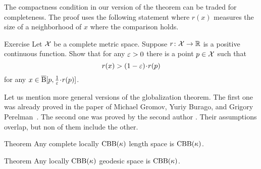 The compactness condition in our version of the theorem can be traded for completeness.
The proof uses the following statement where $r(x)$ measures the size of a neighborhood of $x$ where the comparison holds.

\begin{thm}{Exercise}\label{ex:alm-min}
Let $\mathcal{X}$ be a complete metric space.
Suppose $r\colon\mathcal{X}\to \mathbb{R}$ is a positive continuous function.
Show that for any $\varepsilon>0$ there is a point $p\in \mathcal{X}$ such that 
\[r(x)> (1-\eps)\cdot r(p)\] 
for any $x\in \cBall[p,\tfrac{1}{\eps}\cdot r(p)]$.

\end{thm}

Let us mention more general versions of the globalization theorem.
The first one was already proved in the paper of Michael Gromov, Yuriy Burago, and Grigory Perelman~\cite{burago-gromov-perelman}.
The second one was proved by the second author \cite{petrunin:globalization}.
Their assumptions overlap, but non of them include the other.

\begin{thm}{Theorem}
Any complete locally $\mathrm{CBB}(\kappa)$ length space is $\mathrm{CBB}(\kappa)$.

\end{thm}

\begin{thm}{Theorem}\label{ex:noncomplete-globalization}
Any locally $\mathrm{CBB}(\kappa)$ geodesic space is $\mathrm{CBB}(\kappa)$.

\end{thm}




